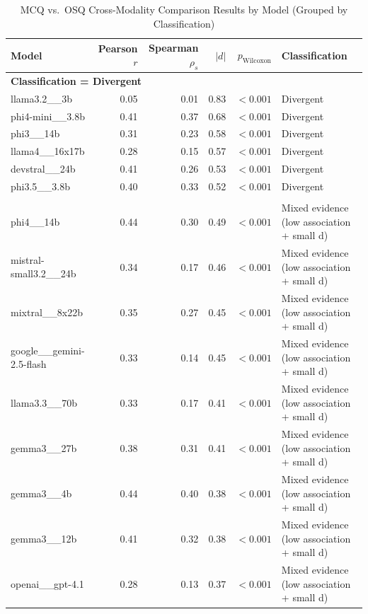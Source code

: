\begin{table}[htbp]
\centering
\caption{MCQ vs.\ OSQ Cross-Modality Comparison Results by Model (Grouped by Classification)}
\label{tab:mcq_osq_results_summary}
\small
\setlength{\tabcolsep}{4pt}
\renewcommand{\arraystretch}{1.1}
\begin{tabular}{l r r r r l}
\toprule
\textbf{Model} & \textbf{Pearson $r$} & \textbf{Spearman $\rho_s$} & \textbf{$|d|$} & \textbf{$p_{\text{Wilcoxon}}$} & \textbf{Classification} \\
\midrule
\multicolumn{6}{l}{\textbf{Classification = Divergent}} \\
\midrule
    llama3.2\_\_3b & 0.05 & 0.01 & 0.83 & $<0.001$ & Divergent \\
    phi4-mini\_\_3.8b & 0.41 & 0.37 & 0.68 & $<0.001$ & Divergent \\
    phi3\_\_14b & 0.31 & 0.23 & 0.58 & $<0.001$ & Divergent \\
    llama4\_\_16x17b & 0.28 & 0.15 & 0.57 & $<0.001$ & Divergent \\
    devstral\_\_24b & 0.41 & 0.26 & 0.53 & $<0.001$ & Divergent \\
    phi3.5\_\_3.8b & 0.40 & 0.33 & 0.52 & $<0.001$ & Divergent \\
\addlinespace
\multicolumn{6}{l}{\textbf{Classification = Mixed evidence (low association + small d)}} \\
\midrule
    phi4\_\_14b & 0.44 & 0.30 & 0.49 & $<0.001$ & Mixed evidence (low association + small d) \\
    mistral-small3.2\_\_24b & 0.34 & 0.17 & 0.46 & $<0.001$ & Mixed evidence (low association + small d) \\
    mixtral\_\_8x22b & 0.35 & 0.27 & 0.45 & $<0.001$ & Mixed evidence (low association + small d) \\
    google\_\_gemini-2.5-flash & 0.33 & 0.14 & 0.45 & $<0.001$ & Mixed evidence (low association + small d) \\
    llama3.3\_\_70b & 0.33 & 0.17 & 0.41 & $<0.001$ & Mixed evidence (low association + small d) \\
    gemma3\_\_27b & 0.38 & 0.31 & 0.41 & $<0.001$ & Mixed evidence (low association + small d) \\
    gemma3\_\_4b & 0.44 & 0.40 & 0.38 & $<0.001$ & Mixed evidence (low association + small d) \\
    gemma3\_\_12b & 0.41 & 0.32 & 0.38 & $<0.001$ & Mixed evidence (low association + small d) \\
    openai\_\_gpt-4.1 & 0.28 & 0.13 & 0.37 & $<0.001$ & Mixed evidence (low association + small d) \\

\end{tabular}
\end{table}
